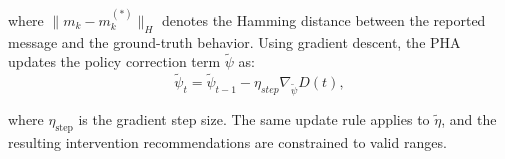 \documentclass[sigconf,review]{acmart}
\begin{document}
where $\lVert m_k - m_k^{(\ast)} \rVert_H$ denotes the Hamming distance between the reported message and the ground-truth behavior.
Using gradient descent, the PHA updates the policy correction term $\tilde{\psi}$ as:
\begin{equation}
\tilde{\psi}_t = \tilde{\psi}_{t-1} - \eta_{step} \nabla_{\tilde{\psi}} D(t),
\end{equation}

where $\eta_{\mathrm{step}}$ is the gradient step size. The same update rule applies to $\widetilde{\eta}$, and the resulting intervention recommendations are constrained to valid ranges.




\end{document}
